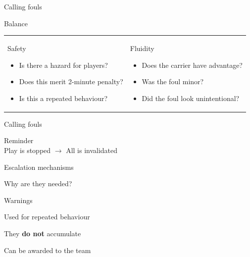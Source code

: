 \documentclass{beamer}
\begin{document}
	\begin{frame}{Calling fouls}
		\begin{center}
			Balance
		\end{center}
		\begin{tabular}{ll}
			\parbox{0.5\textwidth}
			{
				\begin{center}
					Safety
				\end{center}
				\begin{itemize}
					\item Is there a hazard for players?
					\item Does this merit 2-minute penalty?
					\item Is this a repeated behaviour?
				\end{itemize}
			}
			&
			\parbox{0.5\textwidth}
			{
				\begin{center}
					Fluidity
				\end{center}
				\begin{itemize}
					\item Does the carrier have advantage?
					\item Was the foul minor?
					\item Did the foul look unintentional?
				\end{itemize}
			}
		\end{tabular}
	\end{frame}

	\begin{frame}{Calling fouls}
		\begin{center}
			Reminder \\
			Play is stopped $\rightarrow$ All is invalidated
		\end{center}
	\end{frame}

	\begin{frame}{Escalation mechanisms}
		\begin{center}
			Why are they needed?
		\end{center}
	\end{frame}

	\begin{frame}{Warnings}
		\begin{center}
			Used for repeated behaviour

			They \textbf{do not} accumulate

			Can be awarded to the team
		\end{center}
	\end{frame}
\end{document}
